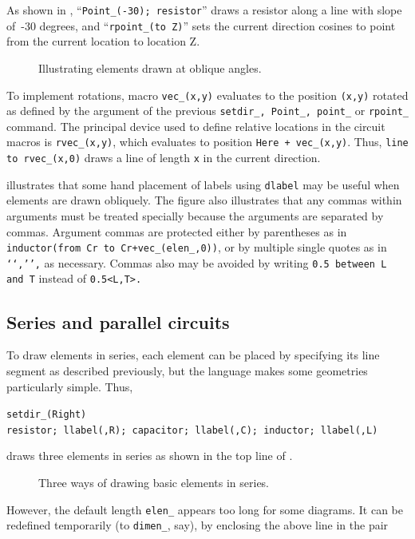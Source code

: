 As shown in ,
``{\tt Point\_(-30); resistor}'' draws a resistor
along a line with slope of~-30 degrees,
and ``{\tt rpoint\_(to Z)}'' sets
the current direction cosines to point from the current location to location Z.
\begin{figure}[hbt]
\vspace{-\baselineskip}
   \parbox{4.5in}{\small }%
   \hfill\raise-0.7in\llap{\hbox{ }}%
   \vspace{-\baselineskip}
   \caption{Illustrating elements drawn at oblique angles.}
   \label{Oblique}
   \end{figure}

To implement rotations, macro {\tt vec\_(x,y)}
evaluates to the position {\tt (x,y)} rotated as defined by the
argument of the previous
{\tt setdir\_, Point\_, point\_} or {\tt rpoint\_} command.
The principal device used to define relative locations in the circuit macros
is {\tt rvec\_(x,y)}, which evaluates to position {\tt Here + vec\_(x,y)}.
Thus, {\tt line to rvec\_(x,0)} draws a line of length {\tt x} in the current
direction.

 illustrates that some hand placement of labels
using {\tt dlabel} may be useful when elements are drawn obliquely.
The figure also illustrates that any commas within \Mfour arguments must
be treated specially because the arguments are separated by commas.
Argument commas are protected either by parentheses as in
{\tt inductor(from Cr to Cr+vec\_(elen\_,0))}, or by multiple single quotes
as in {\tt `{`,'}',} as necessary.
Commas also may be avoided by writing
{\tt 0.5 between L and T} instead of {\tt 0.5<L,T>.}

\subsection{Series and parallel circuits\label{Seriesandparallel:}}

To draw elements in series, each element can be placed by specifying
its line segment as described previously, but the \pic language
makes some geometries particularly simple.  Thus,

{\tt setdir\_(Right)\\ \hspace*{\parindent}%
  resistor; llabel(,R); capacitor; llabel(,C);
  inductor; llabel(,L)}

\noindent
draws three elements in series
as shown in the top line of .
\begin{figure}[H]
\vspace{-\baselineskip}
   
   \caption{Three ways of drawing basic elements in series.}
   \label{Series}
   \end{figure}
However, the default length {\tt elen\_}
appears too long for some diagrams.  It can be redefined temporarily
(to {\tt dimen\_}, say),
by enclosing the above line in the pair

